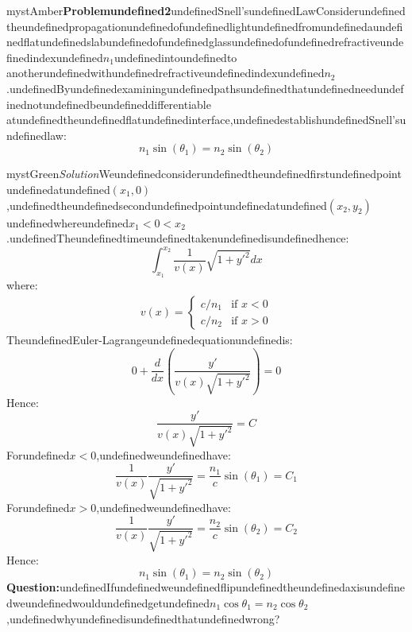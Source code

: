 \begin{mystadmonition}{mystAmber}{\textbf{Problemundefined2}undefinedSnell'sundefinedLaw}Considerundefinedtheundefinedpropagationundefinedofundefinedlightundefinedfromundefinedaundefinedflatundefinedslabundefinedofundefinedglassundefinedofundefinedrefractiveundefinedindexundefined$n_1$undefinedintoundefinedto
anotherundefinedwithundefinedrefractiveundefinedindexundefined$n_2$.undefinedByundefinedexaminingundefinedpathsundefinedthatundefinedneedundefinednotundefinedbeundefineddifferentiable
atundefinedtheundefinedflatundefinedinterface,undefinedestablishundefinedSnell'sundefinedlaw:
\begin{equation}
n_1\sin(\theta_1) = n_2\sin(\theta_2)
\end{equation}

\end{mystadmonition}
\begin{mystadmonition}{mystGreen}{\emph{Solution}}Weundefinedconsiderundefinedtheundefinedfirstundefinedpointundefinedatundefined$(x_1, 0)$,undefinedtheundefinedsecondundefinedpointundefinedatundefined$(x_2,y_2)$undefinedwhereundefined$x_1<0<x_2$.undefinedTheundefinedtimeundefinedtakenundefinedisundefinedhence:
\begin{equation}
\int_{x_1}^{x_2} \frac{1}{v(x)}\sqrt{1+y'^2}dx
\end{equation}
where:
\begin{equation}
\begin{aligned}
v(x)=
\begin{cases}
    c/n_1 &\text{if } x<0 \\
    c/n_2 &\text{if } x>0
\end{cases}
\end{aligned}
\end{equation}
TheundefinedEuler-Lagrangeundefinedequationundefinedis:
\begin{equation}
0 + \frac{d}{dx}\left( \frac{y'}{v(x)\sqrt{1+y'^2}} \right)=0
\end{equation}
Hence:
\begin{equation}
\frac{y'}{v(x)\sqrt{1+y'^2}} =C
\end{equation}
Forundefined$x<0$,undefinedweundefinedhave:
\begin{equation}
\frac{1}{v(x)}\frac{y'}{\sqrt{1+y'^2}} = \frac{n_1}{c}\sin(\theta_1) = C_1
\end{equation}
Forundefined$x>0$,undefinedweundefinedhave:
\begin{equation}
\frac{1}{v(x)}\frac{y'}{\sqrt{1+y'^2}} = \frac{n_2}{c}\sin(\theta_2) = C_2
\end{equation}
Hence:
\begin{equation}
n_1\sin(\theta_1)=n_2\sin(\theta_2)
\end{equation}
\textbf{Question:}undefinedIfundefinedweundefinedflipundefinedtheundefinedaxisundefinedweundefinedwouldundefinedgetundefined$n_1\cos\theta_1=n_2\cos\theta_2$,undefinedwhyundefinedisundefinedthatundefinedwrong?

\end{mystadmonition}
